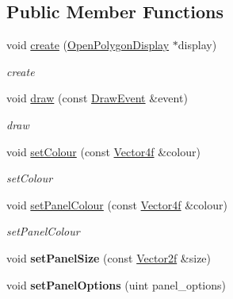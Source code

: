\subsection*{Public Member Functions}
\begin{DoxyCompactItemize}
\item 
void \hyperlink{classEngine_1_1TextElement_afb1353dbbf71285acad8dc20bd473d6d}{create} (\hyperlink{classEngine_1_1OpenPolygonDisplay}{Open\+Polygon\+Display} $\ast$display)
\begin{DoxyCompactList}\small\item\em create \end{DoxyCompactList}\item 
void \hyperlink{classEngine_1_1TextElement_a9f63362e007bb1dc1ea84dc7370f4468}{draw} (const \hyperlink{classEngine_1_1DrawEvent}{Draw\+Event} \&event)
\begin{DoxyCompactList}\small\item\em draw \end{DoxyCompactList}\item 
void \hyperlink{classEngine_1_1TextElement_a644a809d0632165885c4e3b07fb2eb32}{set\+Colour} (const \hyperlink{classVector4}{Vector4f} \&colour)
\begin{DoxyCompactList}\small\item\em set\+Colour \end{DoxyCompactList}\item 
void \hyperlink{classEngine_1_1TextElement_a40cd3013655dea97bf719b70346d28be}{set\+Panel\+Colour} (const \hyperlink{classVector4}{Vector4f} \&colour)
\begin{DoxyCompactList}\small\item\em set\+Panel\+Colour \end{DoxyCompactList}\item 
\hypertarget{classEngine_1_1TextElement_adf59331b24200f9d364abe234d401a77}{}void {\bfseries set\+Panel\+Size} (const \hyperlink{classVector2}{Vector2f} \&size)\label{classEngine_1_1TextElement_adf59331b24200f9d364abe234d401a77}

\item 
\hypertarget{classEngine_1_1TextElement_a372ffe930cee10dcc1544b340eef6d38}{}void {\bfseries set\+Panel\+Options} (uint panel\+\_\+options)\label{classEngine_1_1TextElement_a372ffe930cee10dcc1544b340eef6d38}


\end{DoxyCompactItemize}
